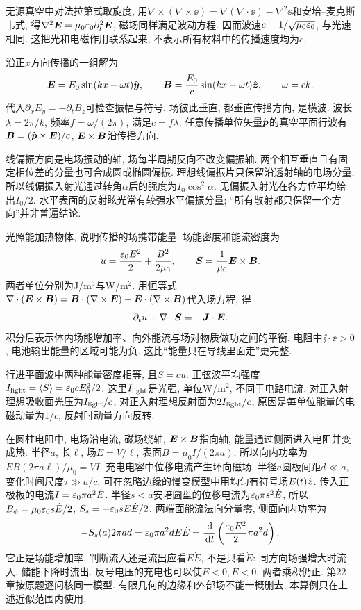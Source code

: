 无源真空中对法拉第式取旋度, 用$\nabla\times(\nabla\times\ee)=\nabla(\nabla\cdot\ee)-\nabla^2\ee$和安培--麦克斯韦式, 得$\nabla^2\boldsymbol{E}=\mu_0\varepsilon_0\partial_t^2\boldsymbol{E}$, 磁场同样满足波动方程. 因而波速$c=1/\sqrt{\mu_0\varepsilon_0}$, 与光速相同. 这把光和电磁作用联系起来, 不表示所有材料中的传播速度均为$c$.

沿正$x$方向传播的一组解为
\[
\boldsymbol{E}=E_0\sin(kx-\omega t)\hat{\boldsymbol{y}},\qquad
\boldsymbol{B}=\frac{E_0}{c}\sin(kx-\omega t)\hat{\boldsymbol{z}},\qquad \omega=ck.
\]
代入$\partial_xE_y=-\partial_tB_z$可检查振幅与符号. 场彼此垂直, 都垂直传播方向, 是横波. 波长$\lambda=2\pi/k$, 频率$f=\omega/(2\pi)$, 满足$c=f\lambda$. 任意传播单位矢量$\hat{\boldsymbol{p}}$的真空平面行波有$\boldsymbol{B}=(\hat{\boldsymbol{p}}\times\boldsymbol{E})/c$, $\boldsymbol{E}\times\boldsymbol{B}$沿传播方向.

线偏振方向是电场振动的轴, 场每半周期反向不改变偏振轴. 两个相互垂直且有固定相位差的分量也可合成圆或椭圆偏振. 理想线偏振片只保留沿透射轴的电场分量, 所以线偏振入射光通过转角$\alpha$后的强度为$I_0\cos^2\alpha$. 无偏振入射光在各方位平均给出$I_0/2$. 水平表面的反射眩光常有较强水平偏振分量; “所有散射都只保留一个方向”并非普遍结论.

光照能加热物体, 说明传播的场携带能量. 场能密度和能流密度为
\[
u=\frac{\varepsilon_0 E^2}2+\frac{B^2}{2\mu_0},\qquad
\boldsymbol{S}=\frac1{\mu_0}\boldsymbol{E}\times\boldsymbol{B}.
\]
两者单位分别为J/m$^3$与W/m$^2$. 用恒等式$\nabla\cdot(\boldsymbol{E}\times\boldsymbol{B})=\boldsymbol{B}\cdot(\nabla\times\boldsymbol{E})-\boldsymbol{E}\cdot(\nabla\times\boldsymbol{B})$代入场方程, 得
\begin{equation}\label{eq:poynting}
\partial_tu+\nabla\cdot\boldsymbol{S}=-\boldsymbol{J}\cdot\boldsymbol{E}.
\end{equation}
积分后表示体内场能增加率、向外能流与场对物质做功之间的平衡. 电阻中$\jj\cdot\ee>0$, 电池输出能量的区域可能为负. 这比“能量只在导线里面走”更完整.

行进平面波中两种能量密度相等, 且$S=cu$. 正弦波平均强度$I_{\rm light}=\langle S\rangle=\varepsilon_0 cE_0^2/2$. 这里$I_{\rm light}$是光强, 单位W/m$^2$, 不同于电路电流. 对正入射理想吸收面光压为$I_{\rm light}/c$, 对正入射理想反射面为$2I_{\rm light}/c$, 原因是每单位能量的电磁动量为$1/c$, 反射时动量方向反转.

在圆柱电阻中, 电场沿电流, 磁场绕轴, $\boldsymbol{E}\times\boldsymbol{B}$指向轴, 能量通过侧面进入电阻并变成热. 半径$a$, 长$\ell$, 场$E=V/\ell$, 表面$B=\mu_0I/(2\pi a)$, 所以向内功率为$EB(2\pi a\ell)/\mu_0=VI$. 充电电容中位移电流产生环向磁场. 半径$a$圆板间距$d\ll a$, 变化时间尺度$\tau\gg a/c$, 可在忽略边缘的慢变模型中用均匀有符号场$E(t)\hat{\boldsymbol{z}}$. 传入正极板的电流$I=\varepsilon_0\pi a^2\dot E$. 半径$s<a$安培圆盘的位移电流为$\varepsilon_0\pi s^2\dot E$, 所以$B_\phi=\mu_0\varepsilon_0 s\dot E/2$, $S_s=-\varepsilon_0 sE\dot E/2$. 两端面能流法向分量零, 侧面向内功率为
\[
-S_s(a)2\pi ad=\varepsilon_0\pi a^2dE\dot E
=\frac{\,\mathrm d}{\,\mathrm d t}\left(\frac{\varepsilon_0 E^2}2\pi a^2d\right).
\]
它正是场能增加率. 判断流入还是流出应看$E\dot E$, 不是只看$\dot E$: 同方向场强增大时流入, 储能下降时流出. 反号电压的充电也可以使$E<0,\dot E<0$, 两者乘积仍正. 第22章按原题逐问核同一模型. 有限几何的边缘和外部场不能一概删去, 本算例只在上述近似范围内使用.

